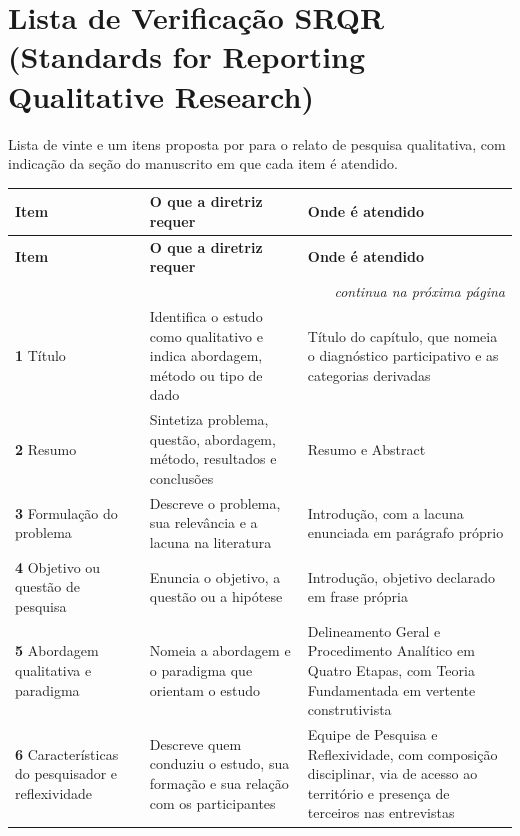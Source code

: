
\section{Lista de Verificação SRQR (Standards for Reporting Qualitative Research)}
\label{app:srqr}

\noindent Lista de vinte e um itens proposta por \cite{OBrien2014} para o relato de pesquisa qualitativa, com indicação da seção do manuscrito em que cada item é atendido.

{\footnotesize
\setlength{\tabcolsep}{3pt}
\begin{longtable}{p{3.6cm}p{4.6cm}p{5.6cm}}
\toprule
\textbf{Item} & \textbf{O que a diretriz requer} & \textbf{Onde é atendido} \\
\midrule
\endfirsthead
\toprule
\textbf{Item} & \textbf{O que a diretriz requer} & \textbf{Onde é atendido} \\
\midrule
\endhead
\midrule
\multicolumn{3}{r}{\footnotesize\textit{continua na próxima página}}\\
\endfoot
\bottomrule
\endlastfoot
\textbf{1} Título & Identifica o estudo como qualitativo e indica abordagem, método ou tipo de dado & Título do capítulo, que nomeia o diagnóstico participativo e as categorias derivadas \\
\addlinespace
\textbf{2} Resumo & Sintetiza problema, questão, abordagem, método, resultados e conclusões & Resumo e Abstract \\
\addlinespace
\textbf{3} Formulação do problema & Descreve o problema, sua relevância e a lacuna na literatura & Introdução, com a lacuna enunciada em parágrafo próprio \\
\addlinespace
\textbf{4} Objetivo ou questão de pesquisa & Enuncia o objetivo, a questão ou a hipótese & Introdução, objetivo declarado em frase própria \\
\addlinespace
\textbf{5} Abordagem qualitativa e paradigma & Nomeia a abordagem e o paradigma que orientam o estudo & Delineamento Geral e Procedimento Analítico em Quatro Etapas, com Teoria Fundamentada em vertente construtivista \\
\addlinespace
\textbf{6} Características do pesquisador e reflexividade & Descreve quem conduziu o estudo, sua formação e sua relação com os participantes & Equipe de Pesquisa e Reflexividade, com composição disciplinar, via de acesso ao território e presença de terceiros nas entrevistas \\

\end{longtable}}
